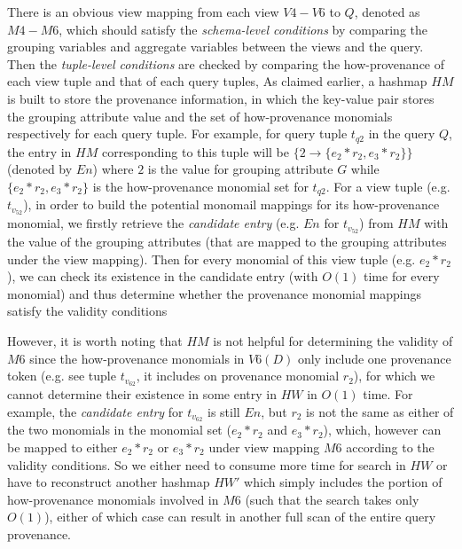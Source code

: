 \begin{example}
\begin{table}[htp]
\end{table}

There is an obvious view mapping from each view $V4-V6$ to $Q$, denoted as $M4-M6$, which should satisfy the {\em schema-level conditions} by comparing the grouping variables and aggregate variables between the views and the query. Then the {\em tuple-level conditions} are checked by comparing the how-provenance of each view tuple and that of each query tuples, As claimed earlier, a hashmap $HM$ is built to store the provenance information, in which the key-value pair stores the grouping attribute value and the set of how-provenance monomials respectively for each query tuple. For example, for query tuple $t_{q2}$ in the query $Q$, the entry in $HM$ corresponding to this tuple will be $\{2\rightarrow \{e_2*r_2, e_3*r_2\}\}$ (denoted by $En$) where $2$ is the value for grouping attribute $G$ while $\{e_2*r_2, e_3*r_2\}$ is the how-provenance monomial set for $t_{q2}$. For a view tuple (e.g. $t_{v_52}$), in order to build the potential monomail mappings for its how-provenance monomial, we firstly retrieve the {\em candidate entry} (e.g. $En$ for $t_{v_52}$) from $HM$ with the value of the grouping attributes (that are mapped to the grouping attributes under the view mapping). Then for every monomial of this view tuple (e.g. $e_2*r_2$), we can check its existence in the candidate entry (with $O(1)$ time for every monomial) and thus determine whether the provenance monomial mappings satisfy the validity conditions

However, it is worth noting that $HM$ is not helpful for determining the validity of $M6$ since the how-provenance monomials in $V6(D)$ only include one provenance token (e.g. see tuple $t_{v_62}$, it includes on provenance monomial $r_2$), for which we cannot determine their existence in some entry in $HW$ in $O(1)$ time. For example, the {\em candidate entry} for $t_{v_62}$ is still $En$, but $r_2$ is not the same as either of the two monomials in the monomial set ($e_2*r_2$ and $e_3*r_2$), which, however can be mapped to either $e_2*r_2$ or $e_3*r_2$ under view mapping $M6$ according to the validity conditions. So we either need to consume more time for search in $HW$ or have to reconstruct another hashmap $HW'$ which simply includes the portion of how-provenance monomials involved in $M6$ (such that the search takes only $O(1)$), either of which case can result in another full scan of the entire query provenance.


\end{example}
